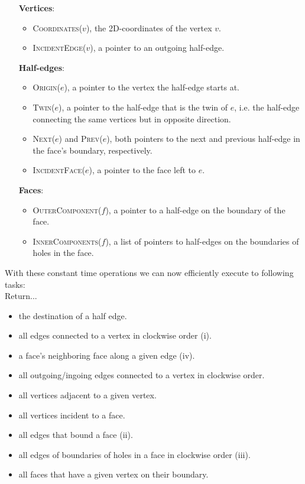     \begin{itemize}[leftmargin=3cm]
        \item[\textbf{Vertices}:] 
        \begin{itemize}[leftmargin=*, itemsep=-3pt]
            \item \textsc{Coordinates}($v$), the 2D-coordinates of the vertex $v$. 
            \item \textsc{IncidentEdge}($v$), a pointer to an outgoing half-edge.
        \end{itemize}

        \item[\textbf{Half-edges}:] 
        \begin{itemize}[leftmargin=*, itemsep=-3pt]
            \item \textsc{Origin}($e$), a pointer to the vertex the half-edge starts at. 
            \item \textsc{Twin}($e$), a pointer to the half-edge that is the twin of $e$, i.e. the half-edge connecting the same vertices but in opposite direction. 
            \item \textsc{Next}($e$) and \textsc{Prev}($e$), both pointers to the next and previous half-edge in the face's boundary, respectively. 
            \item \textsc{IncidentFace}($e$), a pointer to the face left to $e$.
        \end{itemize}

        \item[\textbf{Faces}:] 
        \begin{itemize}[leftmargin=*, itemsep=-3pt]
            \item \textsc{OuterComponent}($f$), a pointer to a half-edge on the boundary of the face.
            \item \textsc{InnerComponents}($f$), a list of pointers to half-edges on the boundaries of holes in the face.
        \end{itemize}
    \end{itemize}
    With these constant time operations we can now  efficiently execute to following tasks: \\
    Return...
    \begin{itemize}[itemsep=-3pt]
        \item the destination of a half edge.
        \item all edges connected to a vertex in clockwise order (i).
        \item a face's neighboring face along a given edge (iv).
        \item all outgoing/ingoing edges connected to a vertex in clockwise order.
        \item all vertices adjacent to a given vertex.
        \item all vertices incident to a face.
        \item all edges that bound a face (ii).
        \item all edges of boundaries of holes in a face in clockwise order (iii).
        \item all faces that have a given vertex on their boundary. 
    \end{itemize}

